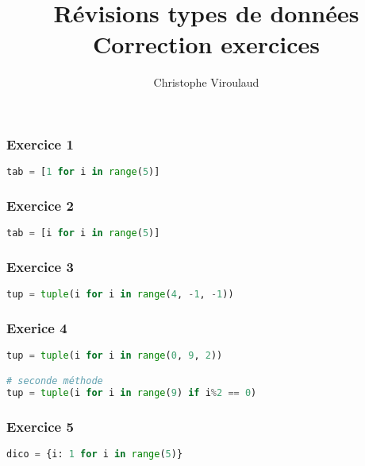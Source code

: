 \documentclass[svgnames,11pt]{beamer}
\author[]{Christophe Viroulaud}
\title{Révisions types de données\\Correction exercices}
\date{\framebox{\textbf{Rév 01}}}
\institute{Terminale - NSI}
\begin{document}
\begin{frame}
\titlepage
\end{frame}
\begin{frame}[fragile]
    \frametitle{Exercice 1}

\begin{exo}
\begin{lstlisting}[language=Python,basicstyle=\ttfamily\small  , xleftmargin=2em, xrightmargin=2em]
tab = [1 for i in range(5)]
\end{lstlisting}
\end{exo}    

\end{frame}
\begin{frame}[fragile]
    \frametitle{Exercice 2}

\begin{exo}
\begin{lstlisting}[language=Python,basicstyle=\ttfamily\small  , xleftmargin=2em, xrightmargin=2em]
tab = [i for i in range(5)]
\end{lstlisting}
\end{exo}    

\end{frame}

\begin{frame}[fragile]
    \frametitle{Exercice 3}

\begin{exo}
\begin{lstlisting}[language=Python,basicstyle=\ttfamily\small  , xleftmargin=2em, xrightmargin=2em]
tup = tuple(i for i in range(4, -1, -1))
\end{lstlisting}
\end{exo}   

\end{frame}

\begin{frame}[fragile]
    \frametitle{Exerice 4}

\begin{exo}
\begin{lstlisting}[language=Python ,basicstyle=\ttfamily\small , xleftmargin=2em, xrightmargin=2em]
tup = tuple(i for i in range(0, 9, 2))

# seconde méthode
tup = tuple(i for i in range(9) if i%2 == 0)
\end{lstlisting}
\end{exo}    

\end{frame}

\begin{frame}[fragile]
    \frametitle{Exercice 5}

\begin{exo}
\begin{lstlisting}[language=Python,basicstyle=\ttfamily\small  , xleftmargin=2em, xrightmargin=2em]
dico = {i: 1 for i in range(5)}
\end{lstlisting}
\end{exo}
\end{frame}
\end{document}
